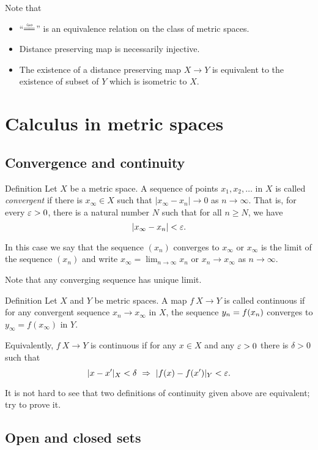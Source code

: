 Note that 
\begin{itemize}
\item ``$\iso$'' is an equivalence relation on the class of metric spaces.
\item Distance preserving map is necessarily injective.
\item The existence of a distance preserving map $X\to Y$ is equivalent to the existence of subset of $Y$ which is isometric to $X$.
\end{itemize}

\section{Calculus in metric spaces}

\subsection*{Convergence and continuity}

\begin{thm}{Definition}
 Let $X$ be a metric space.
A sequence of points $x_1, x_2, \ldots$ in $X$ is called \emph{convergent}
if there is 
$x_\infty\in X$ such that $|x_\infty -x_n|\to 0$ as $n\to\infty$.  
That is, for every $\varepsilon > 0$, there is a natural number $N$ such that for all $n \geq N$, we have $$|x_\infty-x_n| < \varepsilon.$$

In this case we say that the sequence $(x_n)$ converges to $x_\infty$ 
or $x_\infty$ is the limit of the sequence $(x_n)$
and write 
$x_\infty=\lim_{n\to\infty} x_n$
or $x_n\to x_\infty$ as $n\to\infty$.
\end{thm}

Note that any converging sequence has unique limit.

\begin{thm}{Definition}
Let $X$ and $Y$ be metric spaces.
A map $f\:X\to Y$ is called continuous if for any convergent sequence $x_n\to x_\infty$ in $X$,
the sequence $y_n\z=f(x_n)$ converges to $y_\infty=f(x_\infty)$ in $Y$.

Equivalently, $f\:X\to Y$ is continuous if for any $x\in X$ and any $\varepsilon>0$
there is $\delta>0$ such that 
$$|x-x'|_X<\delta\ \Rightarrow\ |f(x)-f(x')|_Y<\eps.$$

\end{thm}

It is not hard to see that two definitions of continuity given above are equivalent;
try to prove it.

\subsection*{Open and closed sets}

